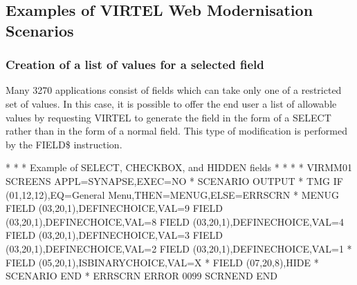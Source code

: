 \documentclass[letterpaper,10pt,english]{sphinxmanual}
\begin{document}
\subsection{Examples of VIRTEL Web Modernisation Scenarios}
\label{\detokenize{User_Guide:examples-of-virtel-web-modernisation-scenarios}}

\subsubsection{Creation of a list of values for a selected field}
\label{\detokenize{User_Guide:creation-of-a-list-of-values-for-a-selected-field}}
Many 3270 applications consist of fields which can take only one of a restricted set of values. In this case, it is possible
to offer the end user a list of allowable values by requesting VIRTEL to generate the field in the form of a SELECT rather
than in the form of a normal field. This type of modification is performed by the FIELD\$ instruction.

\begin{sphinxVerbatim}[commandchars=\\\{\}]
* \PYGZhy{}\PYGZhy{}\PYGZhy{}\PYGZhy{}\PYGZhy{}\PYGZhy{}\PYGZhy{}\PYGZhy{}\PYGZhy{}\PYGZhy{}\PYGZhy{}\PYGZhy{}\PYGZhy{}\PYGZhy{}\PYGZhy{}\PYGZhy{}\PYGZhy{}\PYGZhy{}\PYGZhy{}\PYGZhy{}\PYGZhy{}\PYGZhy{}\PYGZhy{}\PYGZhy{}\PYGZhy{}\PYGZhy{}\PYGZhy{}\PYGZhy{}\PYGZhy{}\PYGZhy{}\PYGZhy{}\PYGZhy{}\PYGZhy{}\PYGZhy{}\PYGZhy{}\PYGZhy{}\PYGZhy{}\PYGZhy{}\PYGZhy{}\PYGZhy{}\PYGZhy{}\PYGZhy{}\PYGZhy{}\PYGZhy{}\PYGZhy{}\PYGZhy{}\PYGZhy{}\PYGZhy{}\PYGZhy{}\PYGZhy{}\PYGZhy{}\PYGZhy{}\PYGZhy{}\PYGZhy{}\PYGZhy{}\PYGZhy{}\PYGZhy{}\PYGZhy{}\PYGZhy{}\PYGZhy{}\PYGZhy{}\PYGZhy{}\PYGZhy{}\PYGZhy{} *
* Example of SELECT, CHECKBOX, and HIDDEN fields *
* \PYGZhy{}\PYGZhy{}\PYGZhy{}\PYGZhy{}\PYGZhy{}\PYGZhy{}\PYGZhy{}\PYGZhy{}\PYGZhy{}\PYGZhy{}\PYGZhy{}\PYGZhy{}\PYGZhy{}\PYGZhy{}\PYGZhy{}\PYGZhy{}\PYGZhy{}\PYGZhy{}\PYGZhy{}\PYGZhy{}\PYGZhy{}\PYGZhy{}\PYGZhy{}\PYGZhy{}\PYGZhy{}\PYGZhy{}\PYGZhy{}\PYGZhy{}\PYGZhy{}\PYGZhy{}\PYGZhy{}\PYGZhy{}\PYGZhy{}\PYGZhy{}\PYGZhy{}\PYGZhy{}\PYGZhy{}\PYGZhy{}\PYGZhy{}\PYGZhy{}\PYGZhy{}\PYGZhy{}\PYGZhy{}\PYGZhy{}\PYGZhy{}\PYGZhy{}\PYGZhy{}\PYGZhy{}\PYGZhy{}\PYGZhy{}\PYGZhy{}\PYGZhy{}\PYGZhy{}\PYGZhy{}\PYGZhy{}\PYGZhy{}\PYGZhy{}\PYGZhy{}\PYGZhy{}\PYGZhy{}\PYGZhy{}\PYGZhy{}\PYGZhy{}\PYGZhy{} *
*
VIRMM01     SCREENS APPL=SYNAPSE,EXEC=NO
*
SCENARIO    OUTPUT
*
TMG         IF\PYGZdl{} (01,12,12),EQ=\PYGZsq{}General Menu\PYGZsq{},THEN=MENUG,ELSE=ERRSCRN
*
MENUG       FIELD\PYGZdl{} (03,20,1),DEFINE\PYGZhy{}CHOICE,VAL=9
            FIELD\PYGZdl{} (03,20,1),DEFINE\PYGZhy{}CHOICE,VAL=8
            FIELD\PYGZdl{} (03,20,1),DEFINE\PYGZhy{}CHOICE,VAL=4
            FIELD\PYGZdl{} (03,20,1),DEFINE\PYGZhy{}CHOICE,VAL=3
            FIELD\PYGZdl{} (03,20,1),DEFINE\PYGZhy{}CHOICE,VAL=2
            FIELD\PYGZdl{} (03,20,1),DEFINE\PYGZhy{}CHOICE,VAL=1
*
            FIELD\PYGZdl{} (05,20,1),IS\PYGZhy{}BINARY\PYGZhy{}CHOICE,VAL=\PYGZsq{}X\PYGZsq{}
*
            FIELD\PYGZdl{} (07,20,8),HIDE
*
            SCENARIO END
*
ERRSCRN     ERROR\PYGZdl{} 0099
            SCRNEND
END
\end{sphinxVerbatim}
\end{document}
